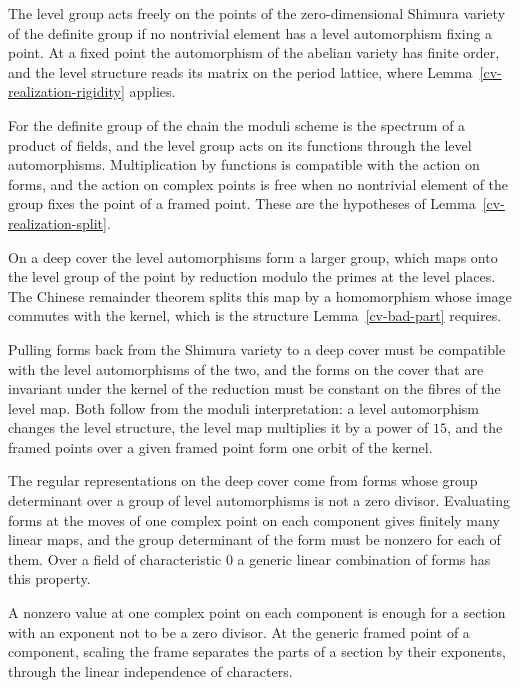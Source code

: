 The level group acts freely on the points of the zero-dimensional Shimura variety of the definite group
if no nontrivial element has a level automorphism fixing a point. At a fixed point the automorphism of the
abelian variety has finite order, and the level structure reads its matrix on the period lattice, where
Lemma~\ref{cv-realization-rigidity} applies.

For the definite group of the chain the moduli scheme is the spectrum of a product of fields, and the level
group acts on its functions through the level automorphisms. Multiplication by functions is compatible
with the action on forms, and the action on complex points is free when no nontrivial element of the
group fixes the point of a framed point. These are the hypotheses of Lemma~\ref{cv-realization-split}.

On a deep cover the level automorphisms form a larger group, which maps onto the level group of the point
by reduction modulo the primes at the level places. The Chinese remainder theorem splits this map by a
homomorphism whose image commutes with the kernel, which is the structure Lemma~\ref{cv-bad-part}
requires.

Pulling forms back from the Shimura variety to a deep cover must be compatible with the level
automorphisms of the two, and the forms on the cover that are invariant under the kernel of the reduction
must be constant on the fibres of the level map. Both follow from the moduli interpretation: a level
automorphism changes the level structure, the level map multiplies it by a power of $15$, and the framed
points over a given framed point form one orbit of the kernel.

The regular representations on the deep cover come from forms whose group determinant over a group of
level automorphisms is not a zero divisor. Evaluating forms at the moves of one complex point on each
component gives finitely many linear maps, and the group determinant of the form must be nonzero for each
of them. Over a field of characteristic $0$ a generic linear combination of forms has this property.

A nonzero value at one complex point on each component is enough for a section with an exponent not to be a
zero divisor. At the generic framed point of a component, scaling the frame separates the parts of a
section by their exponents, through the linear independence of characters.

